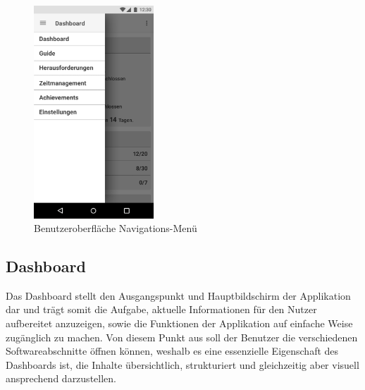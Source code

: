 \documentclass{scrreprt}
\begin{document}
\begin{figure}[H]
	\centering
	\includegraphics[width=0.4\textwidth,keepaspectratio]{Bilder/Prototyp/Menu.png}
	\caption{Benutzeroberfläche Navigations-Menü}
	\label{img:navigation}
\end{figure}

\newpage
\subsection{Dashboard}
\par Das Dashboard stellt den Ausgangspunkt und Hauptbildschirm der Applikation dar und trägt somit die Aufgabe, aktuelle Informationen für den Nutzer aufbereitet anzuzeigen, sowie die Funktionen der Applikation auf einfache Weise zugänglich zu machen. Von diesem Punkt aus soll der Benutzer die verschiedenen Softwareabschnitte öffnen können, weshalb es eine essenzielle Eigenschaft des Dashboards ist, die Inhalte übersichtlich, strukturiert und gleichzeitig aber visuell ansprechend darzustellen.
\end{document}
